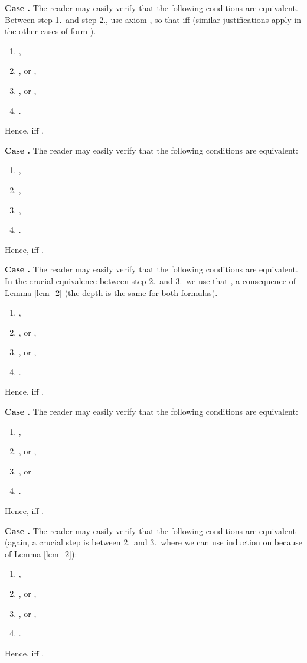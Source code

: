 \documentclass{article}[12pt]
\newenvironment{proof}{\noindent {\bf Proof \ }}{\hfill ~}
\begin{document}
\begin{proof}
\medskip \noindent 
{\bf Case .}
The reader may easily verify that the following conditions are equivalent. Between step 1.\ and step 2., use axiom  , so that   iff   (similar justifications apply in the other cases of form ).
\begin{enumerate}
\item ,
\item , or ,
\item , or ,
\item .
\end{enumerate}
Hence,  iff .


\medskip \noindent 
{\bf Case .}
The reader may easily verify that the following conditions are equivalent:
\begin{enumerate}
\item ,
\item ,
\item ,
\item .
\end{enumerate}
Hence,  iff .


\medskip \noindent 
{\bf Case .}
The reader may easily verify that the following conditions are equivalent. In the crucial equivalence between step 2.\ and 3.\ we use that , a consequence of Lemma \ref{lem_2} (the  depth is the same for both formulas). 
\begin{enumerate}
\item ,
\item , or ,
\item , or ,
\item .
\end{enumerate}
Hence,  iff .


\medskip \noindent 
{\bf Case .}
The reader may easily verify that the following conditions are equivalent:
\begin{enumerate}
\item ,
\item , or ,
\item , or 
\item .
\end{enumerate}
Hence,  iff .


\medskip \noindent 
{\bf Case .}
The reader may easily verify that the following conditions are equivalent (again, a crucial step is between 2.\ and 3.\, where we can use induction on  because of Lemma \ref{lem_2}): 
\begin{enumerate}
\item ,
\item , or ,
\item , or ,
\item .
\end{enumerate}
Hence,  iff .



\end{proof}
\end{document}

